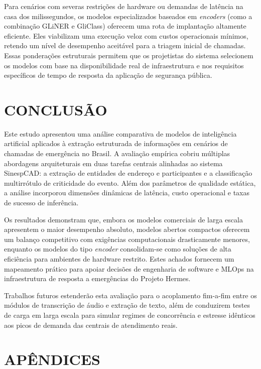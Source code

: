 \documentclass{IEEEphot}
\begin{document}
Para cenários com severas restrições de hardware ou demandas de latência na casa dos milissegundos, os modelos especializados baseados em \textit{encoders} (como a combinação GLiNER e GliClass) oferecem uma rota de implantação altamente eficiente. Eles viabilizam uma execução veloz com custos operacionais mínimos, retendo um nível de desempenho aceitável para a triagem inicial de chamadas. Essas ponderações estruturais permitem que os projetistas do sistema selecionem os modelos com base na disponibilidade real de infraestrutura e nos requisitos específicos de tempo de resposta da aplicação de segurança pública.

\section{CONCLUSÃO}

Este estudo apresentou uma análise comparativa de modelos de inteligência artificial aplicados à extração estruturada de informações em cenários de chamadas de emergência no Brasil. A avaliação empírica cobriu múltiplas abordagens arquiteturais em duas tarefas centrais alinhadas ao sistema SinespCAD: a extração de entidades de endereço e participantes e a classificação multirrótulo de criticidade do evento. Além dos parâmetros de qualidade estática, a análise incorporou dimensões dinâmicas de latência, custo operacional e taxas de sucesso de inferência.

Os resultados demonstram que, embora os modelos comerciais de larga escala apresentem o maior desempenho absoluto, modelos abertos compactos oferecem um balanço competitivo com exigências computacionais drasticamente menores, enquanto os modelos do tipo \textit{encoder} consolidam-se como soluções de alta eficiência para ambientes de hardware restrito. Estes achados fornecem um mapeamento prático para apoiar decisões de engenharia de software e MLOps na infraestrutura de resposta a emergências do Projeto Hermes.

Trabalhos futuros estenderão esta avaliação para o acoplamento fim-a-fim entre os módulos de transcrição de áudio e extração de texto, além de conduzirem testes de carga em larga escala para simular regimes de concorrência e estresse idênticos aos picos de demanda das centrais de atendimento reais.

\section*{APÊNDICES}
\end{document}
